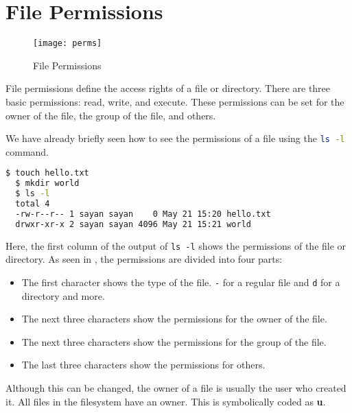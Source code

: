 \vfill
\pagebreak
\section{File Permissions}

\begin{figure}[hb]
  \texttt{[image: perms]}
  \caption[File Permissions]{File Permissions}
\end{figure}

\begin{definition}
  File permissions define the access rights of a file or directory.
  There are three basic permissions: read, write, and execute.
  These permissions can be set for the owner of the file, the group of the file, and others.
\end{definition}

We have already briefly seen how to see the permissions of a file using the \lstinline[language=bash]{ls -l} command.

\begin{lstlisting}[language=bash]
  $ touch hello.txt
  $ mkdir world
  $ ls -l
  total 4
  -rw-r--r-- 1 sayan sayan    0 May 21 15:20 hello.txt
  drwxr-xr-x 2 sayan sayan 4096 May 21 15:21 world
\end{lstlisting}

Here, the first column of the output of \lstinline|ls -l| shows the permissions of the file or directory.
As seen in , the permissions are divided into four parts:

\begin{itemize}
  \item The first character shows the type of the file. \lstinline|-| for a regular file and \lstinline|d| for a directory and more.
  \item The next three characters show the permissions for the owner of the file.
  \item The next three characters show the permissions for the group of the file.
  \item The last three characters show the permissions for others.
\end{itemize}

\begin{definition}[Owner]
  Although this can be changed, the owner of a file is usually the user who created it.
  All files in the filesystem have an owner.
  This is symbolically coded as \textbf{u}.
\end{definition}

